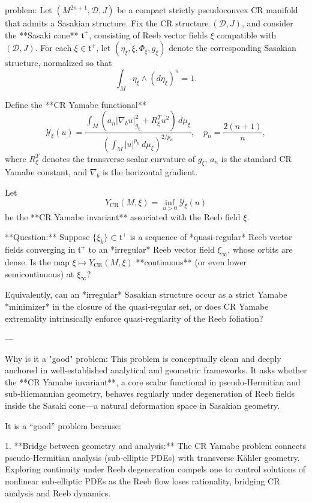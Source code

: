 problem:  
Let \((M^{2n+1}, \mathcal{D}, J)\) be a compact strictly pseudoconvex CR manifold that admits a Sasakian structure.  
Fix the CR structure \((\mathcal{D}, J)\), and consider the **Sasaki cone** \(\mathfrak{t}^+\), consisting of Reeb vector fields \(\xi\) compatible with \((\mathcal{D}, J)\).  
For each \(\xi \in \mathfrak{t}^+\), let \((\eta_\xi, \xi, \Phi_\xi, g_\xi)\) denote the corresponding Sasakian structure, normalized so that  
\[
\int_M \eta_\xi \wedge (d\eta_\xi)^n = 1.
\]

Define the **CR Yamabe functional**  
\[
\mathcal{Y}_\xi(u) = \frac{\int_M \left(a_n |\nabla_b u|_{g_\xi}^2 + R^T_\xi u^2 \right) \, d\mu_\xi}{\left(\int_M |u|^{p_n}\, d\mu_\xi\right)^{2/p_n}},
\quad p_n = \frac{2(n+1)}{n},
\]
where \(R^T_\xi\) denotes the transverse scalar curvature of \(g_\xi\), \(a_n\) is the standard CR Yamabe constant, and \(\nabla_b\) is the horizontal gradient.

Let
\[
Y_{\mathrm{CR}}(M, \xi) = \inf_{u > 0} \mathcal{Y}_\xi(u)
\]
be the **CR Yamabe invariant** associated with the Reeb field \(\xi\).

**Question:**  
Suppose \(\{\xi_k\} \subset \mathfrak{t}^+\) is a sequence of *quasi‑regular* Reeb vector fields converging in \(\mathfrak{t}^+\) to an *irregular* Reeb vector field \(\xi_\infty\), whose orbits are dense.  
Is the map \(\xi \mapsto Y_{\mathrm{CR}}(M, \xi)\) **continuous** (or even lower semicontinuous) at \(\xi_\infty\)?  

Equivalently, can an *irregular* Sasakian structure occur as a strict Yamabe *minimizer* in the closure of the quasi‑regular set, or does CR Yamabe extremality intrinsically enforce quasi‑regularity of the Reeb foliation?

---

Why is it a "good" problem:  
This problem is conceptually clean and deeply anchored in well‑established analytical and geometric frameworks. It asks whether the **CR Yamabe invariant**, a core scalar functional in pseudo‑Hermitian and sub‑Riemannian geometry, behaves regularly under degeneration of Reeb fields inside the Sasaki cone—a natural deformation space in Sasakian geometry.

It is a “good” problem because:

1. **Bridge between geometry and analysis:**  
   The CR Yamabe problem connects pseudo‑Hermitian analysis (sub‑elliptic PDEs) with transverse Kähler geometry. Exploring continuity under Reeb degeneration compels one to control solutions of nonlinear sub‑elliptic PDEs as the Reeb flow loses rationality, bridging CR analysis and Reeb dynamics.


